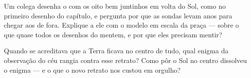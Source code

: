 \begin{exercise}[$\star\star$]\label{exo:g4:solar-system:10}
Um colega desenha o  com os oito  bem
juntinhos em volta do Sol, como no primeiro desenho do capítulo, e
pergunta por que as sondas levam anos para chegar aos  de
fora. Explique a ele com o modelo em escala da praça --- sobre o que
quase todos os desenhos do  mentem, e por que eles
precisam mentir?
\end{exercise}

\begin{exercise}[$\star\star$]\label{exo:g4:solar-system:11}
Quando se acreditava que a Terra ficava no centro de tudo, qual
enigma da observação do céu rangia contra esse retrato? Como pôr o
Sol no centro dissolveu o enigma --- e o que o novo retrato nos
custou em orgulho?
\end{exercise}
